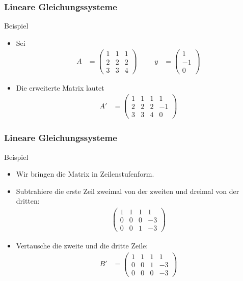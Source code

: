 \documentclass{beamer}
\newcommand\bc[1]{\left({#1}\right)}
\newcommand{\mytitle}{Lineare Gleichungssysteme}
\begin{document}
\begin{frame}\frametitle{\mytitle}
	\begin{block}{Beispiel}
		\begin{itemize}
			\item Sei
				\begin{align*}
					A&=\begin{pmatrix} 1&1&1\\2&2&2\\3&3&4\end{pmatrix}&&&y&=\begin{pmatrix} 1\\-1\\0 \end{pmatrix}
				\end{align*}
			\item Die erweiterte Matrix lautet
				\begin{align*}
					A'&=\bc{\begin{array}{ccc|c} 1&1&1&1\\2&2&2&-1\\3&3&4&0\end{array}}
				\end{align*}
		\end{itemize}
	\end{block}
\end{frame}

\begin{frame}\frametitle{\mytitle}
	\begin{block}{Beispiel}
		\begin{itemize}
			\item Wir bringen die Matrix in Zeilenstufenform.
			\item Subtrahiere die erste Zeil zweimal von der zweiten und dreimal von der dritten:
				\begin{align*}
				\bc{\begin{array}{ccc|c} 1&1&1&1\\0&0&0&-3\\0&0&1&-3\end{array}}
				\end{align*}
			\item Vertausche die zweite und die dritte Zeile:
\begin{align*}
	B'&=\bc{\begin{array}{ccc|c} 1&1&1&1\\0&0&1&-3\\0&0&0&-3\end{array}}
				\end{align*}
		\end{itemize}
	\end{block}
\end{frame}
\end{document}
